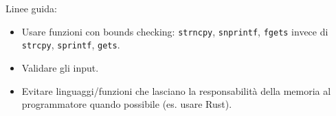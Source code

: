 Linee guida:
\begin{itemize}
  \item Usare funzioni con bounds checking: \texttt{strncpy}, \texttt{snprintf}, \texttt{fgets} invece di \texttt{strcpy}, \texttt{sprintf}, \texttt{gets}.
  \item Validare gli input.
  \item Evitare linguaggi/funzioni che lasciano la responsabilit\`a della memoria al programmatore quando possibile (es. usare Rust).
\end{itemize}

% 
